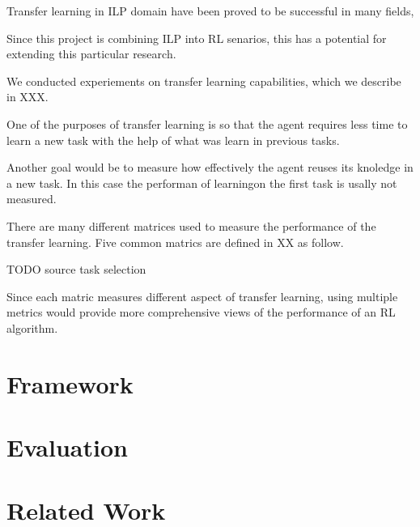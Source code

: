 \documentclass[12pt,twoside]{report}
\theoremstyle{plain}
\theoremstyle{definition}
\begin{document}
Transfer learning in ILP domain have been proved to be successful in many fields,

Since this project is combining ILP into RL senarios, this has a potential for extending this particular research.

We conducted experiements on transfer learning capabilities, which we describe in XXX.

One of the  purposes of transfer learning is so that the agent requires less time to learn a new task with the help of what was learn in previous tasks.


Another goal would be to measure how effectively the agent reuses its knoledge in a new task.
In this case the performan of learningon the first task is usally not measured.

There are many different matrices used to measure the performance of the transfer learning.
Five common matrics are defined in XX as follow.

TODO source task selection

%

Since each matric measures different aspect of transfer learning, using multiple metrics would provide more comprehensive views of the performance of an RL algorithm.
%

\chapter{Framework}
\label{framework}


\chapter{Evaluation}
\label{evaluation}


\chapter{Related Work}
\label{related_work}

\end{document}
